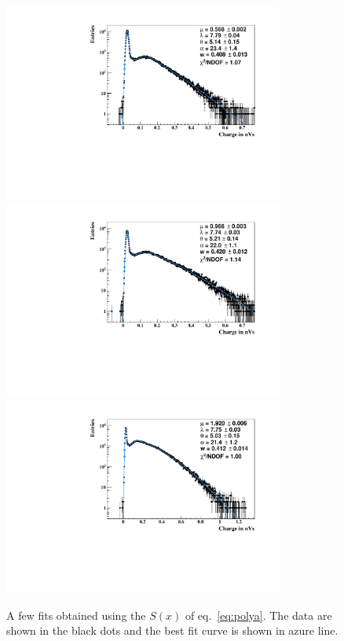\documentclass[a4paper,11pt]{article}
\begin{document}
\begin{figure}[!t]
\centering
\includegraphics[width=9.2cm, height=6.5cm]{figures/fit-05.pdf} \\[1.5ex]
\includegraphics[width=9.2cm, height=6.5cm]{figures/fit-10.pdf}  \\[1.5ex] %
\includegraphics[width=9.2cm, height=6.5cm]{figures/fit-20.pdf} %
\caption{A few fits obtained using the $S(x)$ of eq.~\eqref{eq:polya}. 
The data are shown in the black dots and the best fit curve is shown in azure line. }
\label{fig:fit}
\end{figure}
\end{document}
